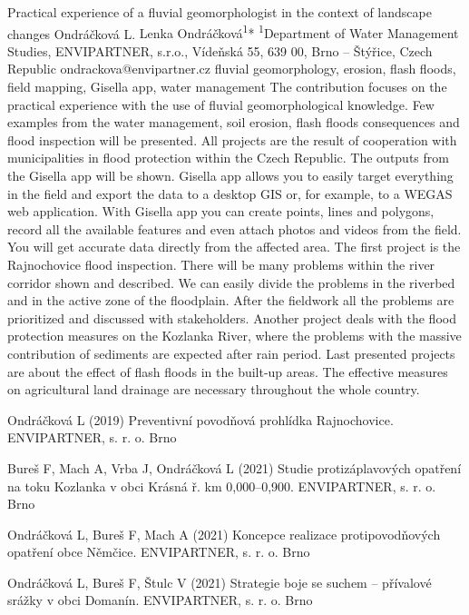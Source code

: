 \abstract
{Practical experience of a fluvial geomorphologist in the context of landscape changes} 
{Ondráčková L.} 
{Lenka Ondráčková\textsuperscript{1}*} 
{\TLtag} 
{
\textsuperscript{1}Department of Water Management Studies, ENVIPARTNER, s.r.o., Vídeňská 55,
	639 00, Brno – Štýřice, Czech Republic
}
{ondrackova@envipartner.cz}  %
{fluvial geomorphology, erosion, flash floods, field mapping, Gisella app, water management}
{The contribution focuses on the practical experience with the use of fluvial geomorphological knowledge. Few examples from the water management, soil erosion, flash floods consequences and flood inspection will be presented. All projects are the result of cooperation with municipalities in flood protection within the Czech Republic. The outputs from the Gisella app will be shown. Gisella app allows you to easily target everything in the field and export the data to a desktop GIS or, for example, to a WEGAS web application. With Gisella app you can create points, lines and polygons, record all the available features and even attach photos and videos from the field. You will get accurate data directly from the affected area. The first project is the Rajnochovice flood inspection. There will be many problems within the river corridor shown and described. We can easily divide the problems in the riverbed and in the active zone of the floodplain. After the fieldwork all the problems are prioritized and discussed with stakeholders. Another project deals with the flood protection measures on the Kozlanka River, where the problems with the massive contribution of sediments are expected after rain period. Last presented projects are about the effect of flash floods in the built-up areas. The effective measures on agricultural land drainage are necessary throughout the whole country. 
}
{Ondráčková L (2019) Preventivní povodňová prohlídka Rajnochovice. ENVIPARTNER, s. r. o. Brno

Bureš F, Mach A, Vrba J, Ondráčková L (2021) Studie protizáplavových opatření na toku Kozlanka v obci Krásná ř. km 0,000--0,900. ENVIPARTNER, s. r. o. Brno

Ondráčková L, Bureš F, Mach A (2021) Koncepce realizace protipovodňových opatření obce Němčice. ENVIPARTNER, s. r. o. Brno

Ondráčková L, Bureš F, Štulc V (2021) Strategie boje se suchem – přívalové srážky v obci Domanín. ENVIPARTNER, s. r. o. Brno 
}

